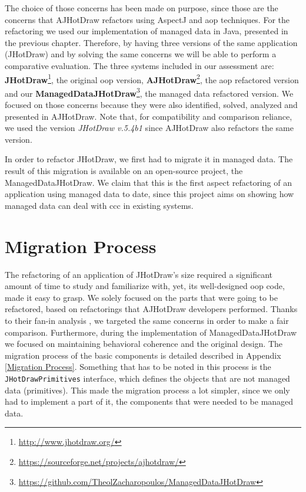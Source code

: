 The choice of those concerns has been made on purpose, since those are the concerns that AJHotDraw refactors using AspectJ and \ac{aop} techniques.
For the refactoring we used our implementation of managed data in Java, presented in the previous chapter.
Therefore, by having three versions of the same application (JHotDraw) and by solving the same concerns we will be able to perform a comparative evaluation.
The three systems included in our assessment are: \textbf{JHotDraw}\footnote{\url{http://www.jhotdraw.org/}}, the original \ac{oop} version, \textbf{AJHotDraw}\footnote{\url{https://sourceforge.net/projects/ajhotdraw/}}, the \ac{aop} refactored version and our \textbf{ManagedDataJHotDraw}\footnote{\url{https://github.com/TheolZacharopoulos/ManagedDataJHotDraw}}, the managed data refactored version.
We focused on those concerns because they were also identified, solved, analyzed and presented in AJHotDraw.
Note that, for compatibility and comparison reliance, we used the version \textit{JHotDraw v.5.4b1} since AJHotDraw also refactors the same version.

In order to refactor JHotDraw, we first had to migrate it in managed data.
The result of this migration is available on an open-source project, the ManagedDataJHotDraw.
We claim that this is the first aspect refactoring of an application using managed data to date, since this project aims on showing how managed data can deal with \ac{ccc} in existing systems.

\section{Migration Process}\label{Migration}
The refactoring of an application of JHotDraw's size required a significant amount of time to study and familiarize with, yet, its well-designed \ac{oop} code, made it easy to grasp.
We solely focused on the parts that were going to be refactored, based on refactorings that AJHotDraw developers \cite{marinajhotdraw} performed.
Thanks to their fan-in analysis \cite{marin2004identifying}, we targeted the same concerns in order to make a fair comparison.
Furthermore, during the implementation of ManagedDataJHotDraw we focused on maintaining behavioral coherence and the original design.
The migration process of the basic components is detailed described in Appendix \ref{Migration Process}.
Something that has to be noted in this process is the \texttt{JHotDrawPrimitives} interface, which defines the objects that are not managed data (primitives).
This made the migration process a lot simpler, since we only had to implement a part of it, the components that were needed to be managed data.
 
